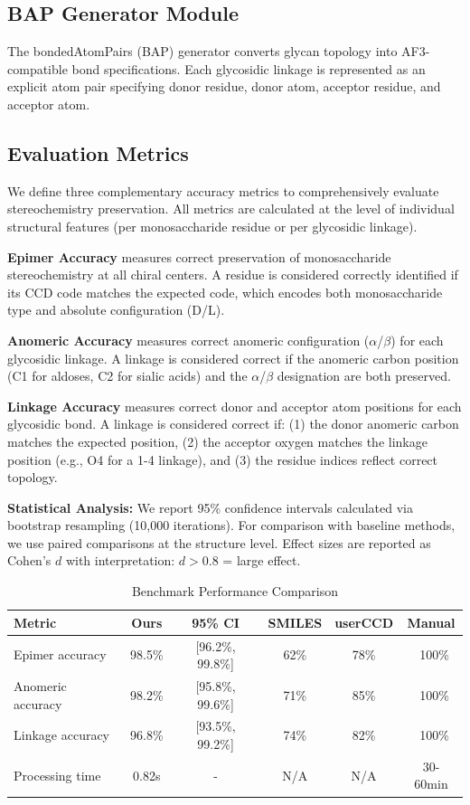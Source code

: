 \documentclass[11pt,a4paper]{article}
\begin{document}
\subsection{BAP Generator Module}

The bondedAtomPairs (BAP) generator converts glycan topology into AF3-compatible bond specifications. Each glycosidic linkage is represented as an explicit atom pair specifying donor residue, donor atom, acceptor residue, and acceptor atom.

\subsection{Evaluation Metrics}
\label{sec:metrics}

We define three complementary accuracy metrics to comprehensively evaluate stereochemistry preservation. All metrics are calculated at the level of individual structural features (per monosaccharide residue or per glycosidic linkage).

\textbf{Epimer Accuracy} measures correct preservation of monosaccharide stereochemistry at all chiral centers. A residue is considered correctly identified if its CCD code matches the expected code, which encodes both monosaccharide type and absolute configuration (D/L).

\textbf{Anomeric Accuracy} measures correct anomeric configuration ($\alpha$/$\beta$) for each glycosidic linkage. A linkage is considered correct if the anomeric carbon position (C1 for aldoses, C2 for sialic acids) and the $\alpha$/$\beta$ designation are both preserved.

\textbf{Linkage Accuracy} measures correct donor and acceptor atom positions for each glycosidic bond. A linkage is considered correct if: (1) the donor anomeric carbon matches the expected position, (2) the acceptor oxygen matches the linkage position (e.g., O4 for a 1-4 linkage), and (3) the residue indices reflect correct topology.

\noindent\textbf{Statistical Analysis:} We report 95\% confidence intervals calculated via bootstrap resampling (10,000 iterations). For comparison with baseline methods, we use paired comparisons at the structure level. Effect sizes are reported as Cohen's $d$ with interpretation: $d > 0.8$ = large effect.


\begin{table}[h]
\centering
\caption{Benchmark Performance Comparison}
\begin{tabular}{lccccc}
\toprule
Metric & Ours & 95\% CI & SMILES & userCCD & Manual \\
\midrule
Epimer accuracy & 98.5\% & [96.2\%, 99.8\%] & 62\% & 78\% & ~100\% \\
Anomeric accuracy & 98.2\% & [95.8\%, 99.6\%] & 71\% & 85\% & ~100\% \\
Linkage accuracy & 96.8\% & [93.5\%, 99.2\%] & 74\% & 82\% & ~100\% \\
Processing time & 0.82s & - & N/A & N/A & 30-60min \\
\bottomrule
\end{tabular}
\end{table}
\end{document}

